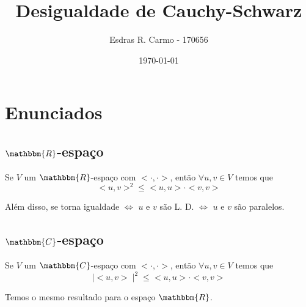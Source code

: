 \documentclass{article}
\author{Esdras R. Carmo - 170656}
\title{Desigualdade de Cauchy-Schwarz}
\date{\today}
\newcommand{\REAL} {\mathbbm{R}}
\newcommand{\COMPLEX} {\mathbbm{C}}
\newcommand{\interno}[0] {<\cdot, \cdot>}
\begin{document}
    \maketitle

    \section{Enunciados}
        \subsection{$\REAL$-espaço}
            Se $V$ um $\REAL$-espaço com $\interno$, então $\forall u, v \in V$ temos que 
            \[
                <u,v>^2 \leq <u,u> \cdot <v,v>
            \]

            Além disso, se torna igualdade $\Leftrightarrow$ $u$ e $v$ são L. D. $\Leftrightarrow$
            $u$ e $v$ são paralelos.

        \subsection{$\COMPLEX$-espaço}
            Se $V$ um $\COMPLEX$-espaço com $\interno$, então $\forall u, v \in V$ temos que 
            \[
                \mid<u,v>\mid^2 \leq <u,u> \cdot <v,v>
            \]
    
            Temos o mesmo resultado para o espaço $\REAL$.
\end{document}
